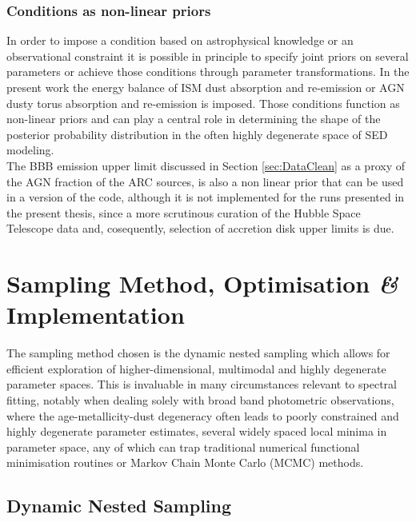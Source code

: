 \subsubsection*{Conditions as non-linear priors}
In order to impose a condition based on astrophysical knowledge or an observational constraint it is possible in principle to specify joint priors on several parameters or achieve those conditions through parameter transformations. In the present work the energy balance of ISM dust absorption and re-emission or AGN dusty torus absorption and re-emission is imposed. Those conditions function as non-linear priors and can play a central role in determining the shape of the posterior probability distribution in the often highly degenerate space of SED modeling.\\
The BBB emission upper limit discussed in Section \ref{sec:DataClean} as a proxy of the AGN fraction of the ARC sources, is also a non linear prior that can be used in a version of the code, although it is not implemented for the runs presented in the present thesis, since a more scrutinous curation of the Hubble Space Telescope data and, cosequently, selection of accretion disk upper limits is due. 

\section{Sampling Method, Optimisation \textit{\&} Implementation}\label{sec:SamplingMethod}

The sampling method chosen is the dynamic nested sampling which allows for efficient exploration of higher-dimensional, multimodal and highly degenerate parameter spaces\cite{Skilling2006}.
This is invaluable in many circumstances relevant to spectral fitting, notably when dealing solely with broad band photometric observations, where the age-metallicity-dust degeneracy often leads to poorly constrained and highly degenerate parameter estimates, several widely spaced local minima in parameter space, any of which can trap traditional numerical functional minimisation routines or Markov Chain Monte Carlo (MCMC) methods.
\subsection{Dynamic Nested Sampling}

